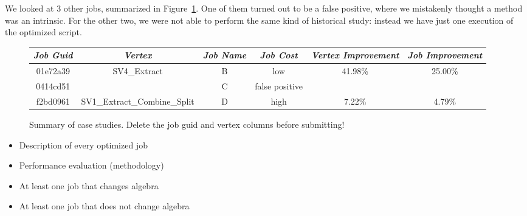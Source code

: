 We looked at 3 other jobs, summarized in Figure~\ref{fig:caseStudySummary}.
One of them turned out to be a false positive, where we mistakenly thought a method was an intrinsic.
For the other two, we were not able to perform the same kind of historical study: instead we have just one execution of the optimized script.
\begin{figure}[ht]
\begin{tabular}{c|c|c|c|c|c} 
{\em Job Guid} & {\em Vertex} & {\em Job Name} & {\em Job Cost} & {\em Vertex Improvement} & {\em Job Improvement} \\ \hline
01e72a39 & SV4\_Extract & B & low & 41.98\% & 25.00\% \\
0414cd51 & & C & false positive \\
f2bd0961 & SV1\_Extract\_Combine\_Split & D & high & 7.22\% & 4.79\%
\end{tabular}
\caption{Summary of case studies. {\sc Delete the job guid and vertex columns before submitting!}
\label{fig:caseStudySummary}}
\end{figure}




\begin{itemize}
\item Description of every optimized job
\item Performance evaluation (methodology)
\item At least one job that changes algebra
\item At least one job that does not change algebra
\end{itemize}
